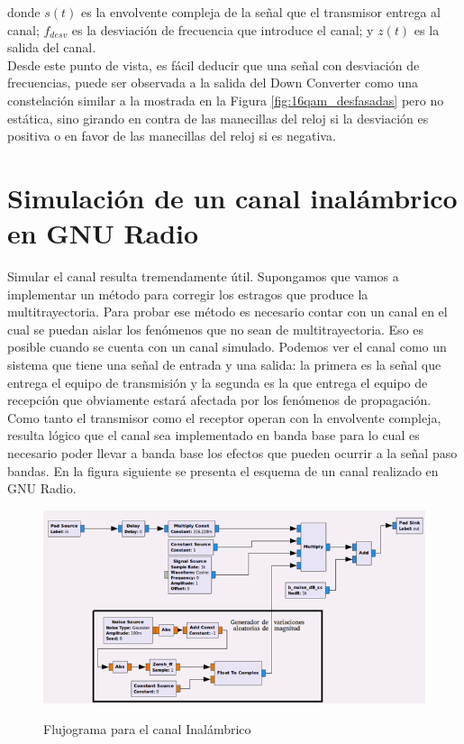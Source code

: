 donde $s(t)$ es la envolvente compleja de la señal que el transmisor entrega al canal; $f_{desv}$ es la desviación de frecuencia que introduce el canal; y $z(t)$ es la salida del canal.\\
Desde este punto de vista, es fácil deducir que una señal con desviación de frecuencias, puede ser observada a la salida del Down Converter como una constelación similar a la mostrada en la Figura \ref{fig:16qam_desfasadas} pero no estática, sino girando en contra de las manecillas del reloj si la desviación es positiva o en favor de las manecillas del reloj si es negativa. 

\section{Simulación de un canal inalámbrico en GNU Radio}

Simular el canal resulta tremendamente útil. Supongamos que vamos a implementar un método para corregir los estragos que produce la multitrayectoria. Para probar ese método es necesario contar con un canal en el cual se puedan aislar los fenómenos que no sean de multitrayectoria. Eso es posible cuando se cuenta con un canal simulado. Podemos ver el canal como un sistema que tiene una señal de entrada y una salida: la primera es la señal que entrega el equipo de transmisión y la segunda es la que entrega el equipo de recepción que obviamente estará afectada por los fenómenos de propagación. Como tanto el transmisor como el receptor operan con la envolvente compleja, resulta lógico que el canal sea implementado en banda base para lo cual es necesario poder llevar a banda base los efectos que pueden ocurrir a la señal paso bandas. En la figura siguiente se presenta el esquema de un canal realizado en GNU Radio.

\vspace{200px}
\begin{figure}[h!]
	\captionsetup{justification = raggedright, singlelinecheck = false}
	\caption{Flujograma para el canal Inalámbrico} 
	\centering
	\includegraphics[scale=0.9]{Imagenes/Bloques.png}
	\label{fig:Bloques}
\end{figure}


